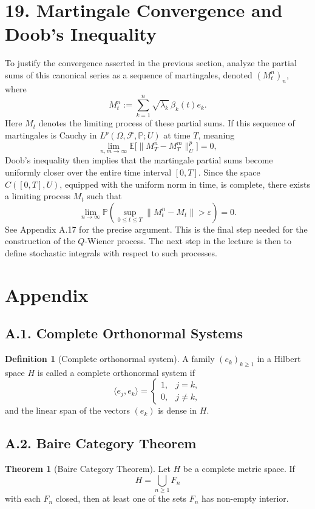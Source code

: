 \documentclass[11pt]{article}
\theoremstyle{definition}
\newtheorem{definition}{Definition}
\newtheorem{theorem}{Theorem}
\theoremstyle{remark}
\begin{document}
\section*{19. Martingale Convergence and Doob's Inequality}
To justify the convergence asserted in the previous section, analyze the partial sums of this canonical series as a sequence of martingales, denoted \((M_t^n)_n\), where
\[
M_t^n:=\sum_{k=1}^n \sqrt{\lambda_k}\,\beta_k(t)e_k.
\]
Here \(M_t\) denotes the limiting process of these partial sums.
If this sequence of martingales is Cauchy in \(L^p(\Omega,\mathcal F,\mathbb P;U)\) at time \(T\), meaning
\[
\lim_{n,m\to\infty}\mathbb E\bigl[\|M_T^n-M_T^m\|_U^p\bigr]=0,
\]
Doob's inequality then implies that the martingale partial sums become uniformly closer over the entire time interval \([0,T]\). Since the space \(C([0,T],U)\), equipped with the uniform norm in time, is complete, there exists a limiting process \(M_t\) such that
\[
\lim_{n\to\infty}\mathbb P\left(\sup_{0\le t\le T}\|M_t^n-M_t\|>\varepsilon\right)=0.
\]
See Appendix A.17 for the precise argument.
This is the final step needed for the construction of the \(Q\)-Wiener process. The next step in the lecture is then to define stochastic integrals with respect to such processes.

\section*{Appendix}
\subsection*{A.1. Complete Orthonormal Systems}
\begin{definition}[Complete orthonormal system]
A family $(e_k)_{k\ge 1}$ in a Hilbert space $H$ is called a complete orthonormal system if
\[
\langle e_j,e_k\rangle=
\begin{cases}
1,& j=k,\\
0,& j\ne k,
\end{cases}
\]
and the linear span of the vectors $(e_k)$ is dense in $H$.
\end{definition}

\subsection*{A.2. Baire Category Theorem}
\begin{theorem}[Baire Category Theorem]
Let $H$ be a complete metric space. If
\[
H=\bigcup_{n\ge 1} F_n
\]
with each $F_n$ closed, then at least one of the sets $F_n$ has non-empty interior.
\end{theorem}
\end{document}
